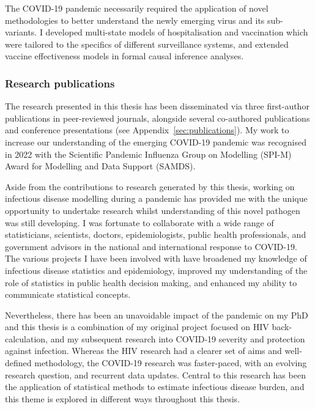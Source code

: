 \begin{impact}
    The COVID-19 pandemic necessarily required the application of novel methodologies to better understand the newly emerging virus and its sub-variants. I developed multi-state models of hospitalisation and vaccination which were tailored to the specifics of different surveillance systems, and extended vaccine effectiveness models in formal causal inference analyses.

    \subsubsection*{Research publications}

    The research presented in this thesis has been disseminated via three first-author publications in peer-reviewed journals, alongside several co-authored publications and conference presentations (see Appendix~\ref{sec:publications}). My work to increase our understanding of the emerging COVID-19 pandemic was recognised in 2022 with the Scientific Pandemic Influenza Group on Modelling (SPI-M) Award for Modelling and Data Support (SAMDS).

    \sectionbreak{}

    Aside from the contributions to research generated by this thesis, working on infectious disease modelling during a pandemic has provided me with the unique opportunity to undertake research whilst understanding of this novel pathogen was still developing. I was fortunate to collaborate with a wide range of statisticians, scientists, doctors, epidemiologists, public health professionals, and government advisors in the national and international response to COVID-19. The various projects I have been involved with have broadened my knowledge of infectious disease statistics and epidemiology, improved my understanding of the role of statistics in public health decision making, and enhanced my ability to communicate statistical concepts.

    Nevertheless, there has been an unavoidable impact of the pandemic on my PhD and this thesis is a combination of my original project focused on HIV back-calculation, and my subsequent research into COVID-19 severity and protection against infection. Whereas the HIV research had a clearer set of aims and well-defined methodology, the COVID-19 research was faster-paced, with an evolving research question, and recurrent data updates. Central to this research has been the application of statistical methods to estimate infectious disease burden, and this theme is explored in different ways throughout this thesis.

\end{impact}